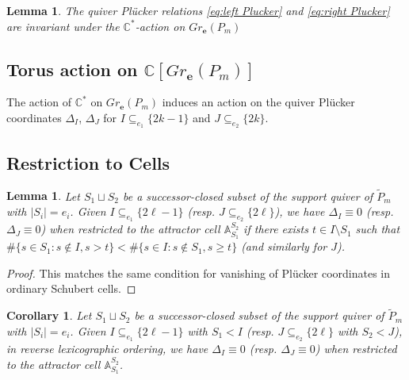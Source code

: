 \documentclass{amsart}
\newtheorem{corollary}[theorem]{Corollary}
\newtheorem{lemma}[theorem]{Lemma}
\numberwithin{equation}{section}
\renewcommand{\AA}{\mathbb{A}}
\newcommand{\CC}{\mathbb{C}}
\newcommand{\bfe}{\mathbf{e}}
\begin{document}
  \begin{lemma}
    The quiver Pl\"ucker relations \eqref{eq:left Plucker} and \eqref{eq:right Plucker} are invariant under the $\CC^*$-action on $Gr_\bfe(P_m)$
  \end{lemma}

  \subsection{Torus action on $\CC[Gr_\bfe(P_m)]$}
  The action of $\CC^*$ on $Gr_\bfe(P_m)$ induces an action on the quiver Pl\"ucker coordinates $\Delta_I$, $\Delta_J$ for $I\subseteq_{e_1} \{2k-1\}$ and $J\subseteq_{e_2} \{2k\}$.


  \subsection{Restriction to Cells}

  \begin{lemma}
    Let $S_1\sqcup S_2$ be a successor-closed subset of the support quiver of $\tilde P_m$ with $|S_i|=e_i$.
    Given $I \subseteq_{e_1} \{2\ell-1\}$ (resp. $J \subseteq_{e_2} \{2\ell\}$), we have $\Delta_I\equiv 0$ (resp. $\Delta_J\equiv 0$) when restricted to the attractor cell $\AA_{S_1}^{S_2}$ if there exists $t\in I\setminus S_1$ such that $\#\{s\in S_1:s\notin I, s>t\} < \#\{s\in I:s\notin S_1, s \ge t\}$ (and similarly for $J$).
  \end{lemma}
  \begin{proof}
    This matches the same condition for vanishing of Pl\"ucker coordinates in ordinary Schubert cells.
  \end{proof}
  \begin{corollary}
    Let $S_1\sqcup S_2$ be a successor-closed subset of the support quiver of $\tilde P_m$ with $|S_i|=e_i$.
    Given $I \subseteq_{e_1} \{2\ell-1\}$ with $S_1<I$ (resp. $J \subseteq_{e_2} \{2\ell\}$ with $S_2<J$), in reverse lexicographic ordering, we have $\Delta_I \equiv 0$ (resp. $\Delta_J\equiv 0$) when restricted to the attractor cell $\AA_{S_1}^{S_2}$.
  \end{corollary}
\end{document}
